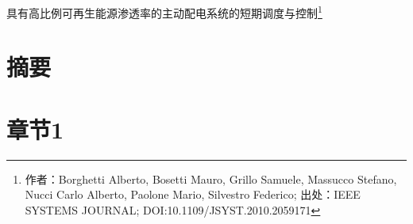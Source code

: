 
\thesistranslationchinese
\begin{center}
\LARGE 具有高比例可再生能源渗透率的主动配电系统的短期调度与控制\footnote{作者：Borghetti Alberto, Bosetti Mauro, Grillo Samuele, Massucco Stefano, Nucci Carlo Alberto, Paolone Mario, Silvestro Federico; 出处：IEEE SYSTEMS JOURNAL; DOI:10.1109/JSYST.2010.2059171}

\end{center}

\section{摘要}

\section{章节1}

